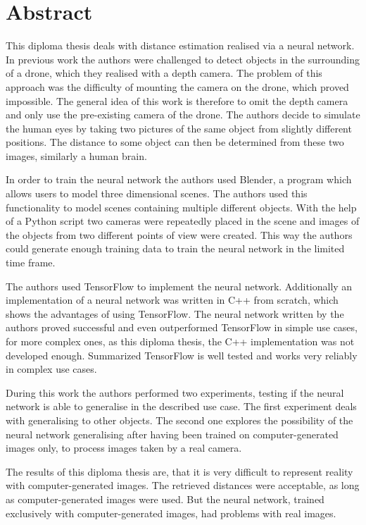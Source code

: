\chapter{Abstract}

This diploma thesis deals with distance estimation realised via a neural network. In previous work the authors were challenged to detect objects in the surrounding of a drone, which they realised with a depth camera. The problem of this approach was the difficulty of mounting the camera on the drone, which proved impossible. The general idea of this work is therefore to omit the depth camera and only use the pre-existing camera of the drone. The authors decide to simulate the human eyes by taking two pictures of the same object from slightly different positions. The distance to some object can then be determined from these two images, similarly a human brain.

In order to train the neural network the authors used Blender, a program which allows users to model three dimensional scenes. The authors used this functionality to model scenes containing multiple different objects. With the help of a Python script two cameras were repeatedly placed in the scene and images of the objects from two different points of view were created. This way the authors could generate enough training data to train the neural network in the limited time frame.

The authors used TensorFlow to implement the neural network. Additionally an implementation of a neural network was written in C++ from scratch, which shows the advantages of using TensorFlow. The neural network written by the authors proved successful and even outperformed TensorFlow in simple use cases, for more complex ones, as this diploma thesis, the C++ implementation was not developed enough. Summarized TensorFlow is well tested and works very reliably in complex use cases.

During this work the authors performed two experiments, testing if the neural network is able to generalise in the described use case. The first experiment deals with generalising to other objects. The second one explores the possibility of the neural network generalising after having been trained on computer-generated images only, to process images taken by a real camera.

The results of this diploma thesis are, that it is very difficult to represent reality with computer-generated images. The retrieved distances were acceptable, as long as computer-generated images were used. But the neural network, trained exclusively with computer-generated images, had problems with real images.